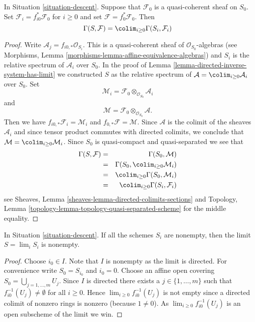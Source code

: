 \begin{lemma}
\label{lemma-descend-section}
In Situation \ref{situation-descent}.
Suppose that $\mathcal{F}_0$ is a quasi-coherent sheaf on $S_0$.
Set $\mathcal{F}_i = f_{i0}^*\mathcal{F}_0$ for $i \geq 0$ and set
$\mathcal{F} = f_0^*\mathcal{F}_0$.
Then
$$
\Gamma(S, \mathcal{F}) = \colim_{i \geq 0} \Gamma(S_i, \mathcal{F}_i)
$$
\end{lemma}

\begin{proof}
Write $\mathcal{A}_j = f_{i0, *} \mathcal{O}_{S_i}$.
This is a quasi-coherent sheaf of $\mathcal{O}_{S_0}$-algebras
(see Morphisms, Lemma \ref{morphisms-lemma-affine-equivalence-algebras})
and $S_i$ is the relative spectrum of $\mathcal{A}_i$ over $S_0$.
In the proof of Lemma \ref{lemma-directed-inverse-system-has-limit}
we constructed $S$ as the relative spectrum of
$\mathcal{A} = \colim_{i \geq 0} \mathcal{A}_i$
over $S_0$. Set
$$
\mathcal{M}_i = \mathcal{F}_0 \otimes_{\mathcal{O}_{S_0}} \mathcal{A}_i
$$
and
$$
\mathcal{M} = \mathcal{F}_0 \otimes_{\mathcal{O}_{S_0}} \mathcal{A}.
$$
Then we have $f_{i0, *} \mathcal{F}_i = \mathcal{M}_i$
and $f_{0, *}\mathcal{F} = \mathcal{M}$. Since $\mathcal{A}$
is the colimit of the sheaves $\mathcal{A}_i$ and since tensor
product commutes with directed colimits, we conclude that
$\mathcal{M} = \colim_{i \geq 0} \mathcal{M}_i$.
Since $S_0$ is quasi-compact and quasi-separated we see that
\begin{eqnarray*}
\Gamma(S, \mathcal{F})
& = &
\Gamma(S_0, \mathcal{M}) \\
& = &
\Gamma(S_0, \colim_{i \geq 0} \mathcal{M}_i) \\
& = &
\colim_{i \geq 0} \Gamma(S_0, \mathcal{M}_i) \\
& = &
\colim_{i \geq 0} \Gamma(S_i, \mathcal{F}_i)
\end{eqnarray*}
see Sheaves, Lemma \ref{sheaves-lemma-directed-colimits-sections} and
Topology, Lemma \ref{topology-lemma-topology-quasi-separated-scheme}
for the middle equality.
\end{proof}

\begin{lemma}
\label{lemma-limit-nonempty}
In Situation \ref{situation-descent}.
If all the schemes $S_i$ are nonempty,
then the limit $S = \lim_i S_i$ is nonempty.
\end{lemma}

\begin{proof}
Choose $i_0 \in I$. Note that $I$ is nonempty as the limit is directed.
For convenience write $S_0 = S_{i_0}$ and $i_0 = 0$.
Choose an affine open covering $S_0 = \bigcup_{j = 1, \ldots, m} U_j$.
Since $I$ is directed there exists a $j \in \{1, \ldots, m\}$
such that $f_{i0}^{-1}(U_j) \not = \emptyset$ for all
$i \geq 0$. Hence $\lim_{i \geq 0} f_{i0}^{-1}(U_j)$ is not
empty since a directed colimit of nonzero rings is nonzero
(because $1 \not = 0$). As $\lim_{i \geq 0} f_{i0}^{-1}(U_j)$
is an open subscheme of the limit we win.
\end{proof}

